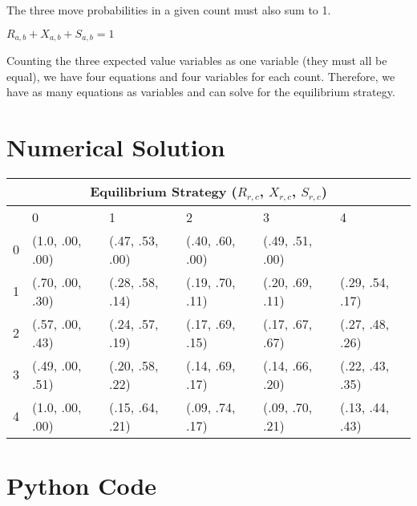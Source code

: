 \documentclass[11pt]{article}
\begin{document}
\begin{multicols}{2}
The three move probabilities in a given count must also sum to 1.

\begin{center}
	$R_{a,b} + X_{a,b} + S_{a,b} = 1$
\end{center}

Counting the three expected value variables as one variable (they must all be equal), we have four equations and four variables for each count. Therefore, we have as many equations as variables and can solve for the equilibrium strategy.

\end{multicols}

\appendix

\section{Numerical Solution}

\begin{center}
\def\arraystretch{1.5}
\begin{tabular}{|p{.5cm}||p{2.5cm}|p{2.5cm}|p{2.5cm}|p{2.5cm}|p{2.5cm}|}
 \hline
 \multicolumn{6}{|c|}{Equilibrium Strategy ($R_{r,c}$, $X_{r,c}$, $S_{r,c}$)} \\
 \hline
    & 0 & 1 & 2 & 3 & 4\\
 \hline
 0 &      (1.0, .00, .00) &    (.47, .53, .00)   &    (.40, .60, .00)   &    (.49, .51, .00)    & \\
 1 &      (.70, .00, .30) &    (.28, .58, .14)   &    (.19, .70, .11)   &    (.20, .69, .11)    & (.29, .54, .17)\\
 2 &      (.57, .00, .43) &    (.24, .57, .19)   &    (.17, .69, .15)   &    (.17, .67, .67)    & (.27, .48, .26)\\
 3 &      (.49, .00, .51) &    (.20, .58, .22)   &    (.14, .69, .17)   &    (.14, .66, .20)    & (.22, .43, .35)\\
 4 &      (1.0, .00, .00) &    (.15, .64, .21)   &    (.09, .74, .17)   &    (.09, .70, .21)    & (.13, .44, .43)\\
 \hline
\end{tabular}
\end{center}

\section{Python Code}
\end{document}
